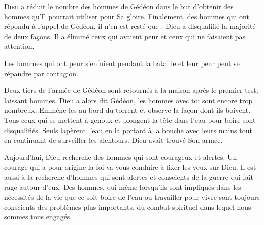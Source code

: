 


\lettrine{D}{ieu} a réduit le nombre des hommes de Gédéon
 dans le but d'obtenir des hommes qu'Il pourrait utiliser pour Sa gloire.
 Finalement, des  hommes qui ont répondu à l'appel de Gédéon,
 il n'en est resté que .
 Dieu a disqualifié la majorité de deux fa\c{c}ons.
 Il a éliminé ceux qui avaient peur et ceux qui ne faisaient pas attention.

Les hommes qui ont peur s'enfuient pendant la bataille et leur peur peut
 se répandre par contagion.


Deux tiers de l'armée de Gédéon sont retournés à la maison
 après le premier test, laissant  hommes.
 Dieu a alors dit\frcolon
 \Og Gédéon, les hommes avec toi sont encore trop nombreux.
 Emmène les au bord du torrent et observe la fa\c{c}on dont ils boivent.
 Tous ceux qui se mettent à genoux et plongent la tête dans l'eau pour boire
 sont disqualifiés. \Fg{}
 Seuls  lapèrent l'eau en la portant à la bouche avec leurs mains
 tout en continuant de surveiller les alentours. Dieu avait trouvé Son armée.

Aujourd'hui, Dieu recherche des hommes qui sont courageux et alertes.
 Un courage qui a pour origine la foi va vous conduire
 à fixer les yeux sur Dieu. Il est aussi à la recherche d'hommes
 qui sont alertes et conscients de la guerre qui fait rage autour d'eux.
 Des hommes, qui même lorsqu'ils sont impliqués dans les nécessités de la vie
 \ocadr que ce soit boire de l'eau ou travailler pour vivre \fcadr{}
 sont toujours conscients des problèmes plus importants,
 du combat spirituel dans lequel nous sommes tous engagés. 

\dvrule




